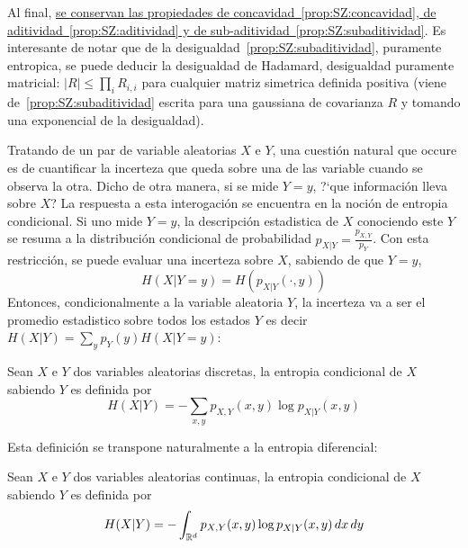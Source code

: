 Al      final,     \underline{se      conservan      las     propiedades      de
  concavidad~\ref{prop:SZ:concavidad},  de aditividad~\ref{prop:SZ:aditividad} y
  de sub-aditividad~\ref{prop:SZ:subaditividad}}.   Es interesante de  notar que
de  la desigualdad~\ref{prop:SZ:subaditividad},  puramente  entropica, se  puede
deducir la  desigualdad de Hadamard,  desigualdad puramente matricial:  $|R| \le
\prod_i  R_{i,i}$  para  cualquier  matriz simetrica  definida  positiva  (viene
de~\ref{prop:SZ:subaditividad} escrita  para una  gaussiana de covarianza  $R$ y
tomando una exponencial de la desigualdad).



\label{s:SZ:Mutua}

Tratando de un par de variable  aleatorias $X$ e $Y$, una cuesti\'on natural que
occure es de cuantificar la incerteza que queda sobre una de las variable cuando
se  observa  la  otra.  Dicho  de  otra  manera, si  se  mide  $Y  =  y$,  ?`que
informaci\'on lleva sobre  $X$? La respuesta a esta  interogaci\'on se encuentra
en la  noci\'on de entropia condicional. Si  uno mide $Y =  y$, la descripci\'on
estadistica de $X$ conociendo este $Y$ se resuma a la distribuci\'on condicional
de  probabilidad $p_{X|Y}  = \frac{p_{X,Y}}{p_Y}$.   Con esta  restricci\'on, se
puede  evaluar una  incerteza sobre  $X$, sabiendo  de que  $Y=y$,
%
\[
H(X|Y=y) = H\left( p_{X|Y}(\cdot,y) \right)
\]
%
Entonces, condicionalmente a la variable aleatoria $Y$, la incerteza va a ser el
promedio  estadistico sobre  todos los  estados $Y$  es decir  $H(X|Y)  = \sum_y
p_Y(y) H(X|Y=y)$:
%
\begin{definicion}\label{def:SZ:entropiacondicional}
  Sean $X$ e $Y$ dos  variables aleatorias discretas, la entropia condicional de
  $X$ sabiendo  $Y$ es  definida por
  \[
  H(X|Y) = - \sum_{x,y} p_{X,Y}(x,y) \log p_{X|Y}(x,y)
  \]
\end{definicion}
%
Esta definici\'on se transpone naturalmente a la entropia diferencial:
%
\begin{definicion}\label{def:SZ:entropiadiferencialcondicional}
  Sean $X$ e $Y$ dos  variables aleatorias continuas, la entropia condicional de
  $X$ sabiendo $Y$ es definida por
  \[
  H(X|Y) = - \int_{\mathbb{R}^d} p_{X,Y}(x,y) \log p_{X|Y}(x,y) \, dx \, dy
  \]
\end{definicion}

